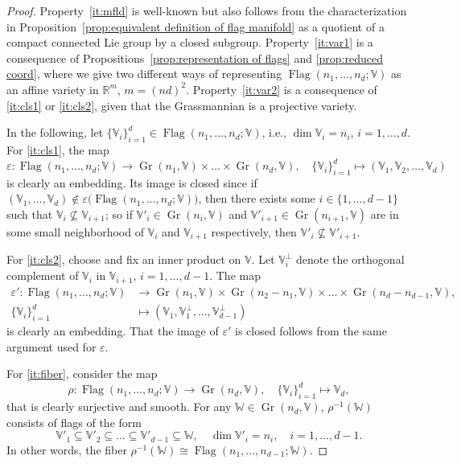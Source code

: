 \documentclass[11pt,reqno]{amsart}%
\theoremstyle{definition}
\theoremstyle{remark}
\DeclareMathOperator{\Gr}{Gr}
\DeclareMathOperator{\Flag}{Flag}
\begin{document}
\begin{proof}
Property~\eqref{it:mfld} is well-known \cite{Monk1959,Borel1991} but also follows from the characterization in Proposition~\ref{prop:equivalent definition of flag manifold} as a quotient of a compact connected Lie group by a closed subgroup. Property~\eqref{it:var1} is a consequence of Propositions~\ref{prop:representation of flags} and \ref{prop:reduced coord}, where we give two different ways of representing $\Flag(n_1,\dots,n_d;\mathbb{V})$ as an affine variety in $\mathbb{R}^m$, $m = (nd)^2$.  Property~\eqref{it:var2} is a consequence of \eqref{it:cls1} or \eqref{it:cls2}, given that the Grassmannian is a projective variety.

In the following, let $\{\mathbb{V}_i\}_{i=1}^d \in \Flag(n_1,\dots,n_d;\mathbb{V})$, i.e., $\dim \mathbb{V}_i = n_i$, $i=1,\dots, d$. For \eqref{it:cls1}, the map 
\begin{equation}\label{eq:j}
\varepsilon : \Flag(n_1,\dots,n_d;\mathbb{V}) \to \Gr(n_1,\mathbb{V})\times \dots \times \Gr(n_d,\mathbb{V}), \quad \{\mathbb{V}_i\}_{i=1}^d \mapsto (\mathbb{V}_1, \mathbb{V}_2, \dots, \mathbb{V}_d)
\end{equation}
is clearly an embedding. Its image is closed since if $(\mathbb{V}_1 , \dots, \mathbb{V}_d) \not\in \varepsilon \bigl(\Flag(n_1,\dots,n_d;\mathbb{V})\bigr)$,
then there exists some $i \in \{ 1,\dots, d-1\}$ such that $\mathbb{V}_i \not\subseteq \mathbb{V}_{i+1}$; so if $\mathbb{V}'_i\in \Gr(n_i,\mathbb{V})$ and $\mathbb{V}'_{i+1} \in \Gr(n_{i+1},\mathbb{V})$ are in some small neighborhood of $\mathbb{V}_i $ and $\mathbb{V}_{i+1}$ respectively, then $\mathbb{V}'_i \not\subseteq \mathbb{V}'_{i+1}$.

For \eqref{it:cls2}, choose and fix an inner product on $\mathbb{V}$. Let $\mathbb{V}_i^{\perp}$ denote the orthogonal complement of $\mathbb{V}_i$ in $\mathbb{V}_{i+1}$, $i=1,\dots, d-1$.
The map
\begin{equation}\label{eq:j2}
\begin{aligned}
\varepsilon ': \Flag(n_1,\dots, n_d;\mathbb{V}) &\to \Gr(n_1,\mathbb{V})\times \Gr(n_2-n_1,\mathbb{V}) \times \dots \times \Gr(n_d-n_{d-1},\mathbb{V}),\\
\{\mathbb{V}_i\}_{i=1}^d &\mapsto (\mathbb{V}_1, \mathbb{V}_1^{\perp}, \dots, \mathbb{V}_{d-1}^{\perp})
\end{aligned}
\end{equation}
is clearly an embedding. That the image of $\varepsilon '$ is closed follows from the same argument used for $\varepsilon$.

For \eqref{it:fiber}, consider the map 
\[
\rho: \Flag(n_1,\dots,n_d;\mathbb{V}) \to \Gr(n_d,\mathbb{V}), \quad \{\mathbb{V}_i\}_{i=1}^d \mapsto \mathbb{V}_d,
\]
that is clearly surjective and smooth. For any  $\mathbb{W} \in  \Gr(n_d,\mathbb{V})$, $\rho^{-1}(\mathbb{W})$ consists of flags of the form 
\[
\mathbb{V}'_1 \subseteq \mathbb{V}'_2 \subseteq \dots \subseteq \mathbb{V}'_{d-1} \subseteq \mathbb{W},\quad \dim \mathbb{V}'_i = n_i,\quad i=1,\dots, d-1.
\]
In other words, the fiber $\rho^{-1}(\mathbb{W}) \cong  \Flag(n_1,\dots, n_{d-1};\mathbb{W})$.
\end{proof}
\end{document}
